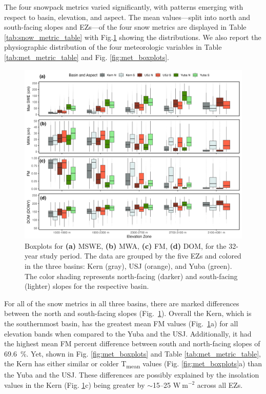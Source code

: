 The four snowpack metrics varied significantly, with patterns emerging with respect to basin, elevation, and aspect. The mean values---split into north and south-facing slopes and EZs---of the four snow metrics are displayed in Table \ref{tab:snow_metric_table} with Fig.\ref{fig:snow_boxplots} showing the distributions. We also report the physiographic distribution of the four meteorologic variables in Table \ref{tab:met_metric_table} and Fig. \ref{fig:met_boxplots}.

\begin{figure}[t]
\includegraphics[width=\textwidth]{figures/ch2_figs/snow4_boxplot_v5.png}
\caption{Boxplots for \textbf{(a)} MSWE, \textbf{(b)} MWA, \textbf{(c)} FM, \textbf{(d)} DOM, for the 32-year study period. The data are grouped by the five EZs and colored in the three basins: Kern (gray), USJ (orange), and Yuba (green). The color shading represents north-facing (darker) and south-facing (lighter) slopes for the respective basin.}
\label{fig:snow_boxplots}
\end{figure}

For all of the snow metrics in all three basins, there are marked differences between the north and south-facing slopes (Fig.~\ref{fig:snow_boxplots}). Overall the Kern, which is the southernmost basin, has the greatest mean FM values (Fig.~\ref{fig:snow_boxplots}a) for all elevation bands when compared to the Yuba and the USJ. Additionally, it had the highest mean FM percent difference between south and north-facing slopes of 69.6~\%. Yet, shown in Fig. \ref{fig:met_boxplots} and Table \ref{tab:met_metric_table}, the Kern has either similar or colder T\textsubscript{mean} values (Fig. \ref{fig:met_boxplots}a) than the Yuba and the USJ. These differences are possibly explained by the insolation values in the Kern (Fig. \ref{fig:snow_boxplots}c) being greater by $\sim$15--25 $\mathrm{W~m}^{-2}$ across all EZs. 

